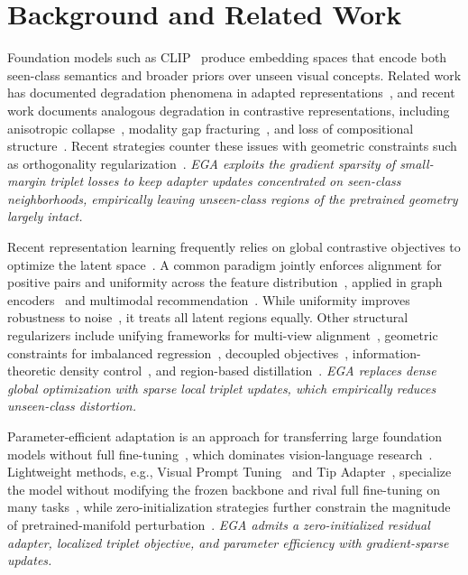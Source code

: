 \documentclass{article}
\begin{document}
\section{Background and Related Work}
\label{sec:lit}

Foundation models such as CLIP~\cite{clip_icml21} produce embedding spaces that encode both seen-class semantics and broader priors over unseen visual concepts.
Related work has documented degradation phenomena in adapted representations~\cite{lanza2026degradationfeaturespacecontinual, xue2025protocol}, and recent work documents analogous degradation in contrastive representations, including anisotropic collapse~\cite{zhao-etal-2024-representation, gao-etal-2021-simcse}, modality gap fracturing~\cite{10656738, eslami2025mitigate}, and loss of compositional structure~\cite{pal2025compositional, savietto2026geometryrepresentationalfailuresvision, 11093676}.
Recent strategies counter these issues with geometric constraints such as orthogonality regularization~\cite{ricci2026boldsymbollambdaorthogonality}.
\emph{EGA exploits the gradient sparsity of small-margin triplet losses
	to keep adapter updates concentrated on seen-class neighborhoods,
	empirically leaving unseen-class regions of the pretrained geometry
	largely intact.}

Recent representation learning frequently relies on global contrastive objectives to optimize the latent space~\cite{sui2026unicon, koromilas2025principledframeworkmultiviewcontrastive}.
A common paradigm jointly enforces alignment for positive pairs and uniformity across the feature distribution~\cite{10.5555/3524938.3525859}, applied in graph encoders~\cite{10.1609/aaai.v38i14.29479} and multimodal recommendation~\cite{zhou2025cm3calibratingmultimodalrecommendation}.
While uniformity improves robustness to noise~\cite{wu2026pca}, it treats all latent regions equally.
Other structural regularizers include unifying frameworks for multi-view alignment~\cite{alshammariunifying}, geometric constraints for imbalanced regression~\cite{dong2025improve}, decoupled objectives~\cite{kim2025decoupledcontrastivelearningfederated}, information-theoretic density control~\cite{Zhang_2025_ICCV}, and region-based distillation~\cite{jing2024fineclip}.
\emph{EGA replaces dense global optimization with sparse local triplet
	updates, which empirically reduces unseen-class distortion.}

Parameter-efficient adaptation is an approach for transferring large foundation models without full fine-tuning~\cite{pmlr-v97-houlsby19a, hu2022lora}, which dominates vision-language research~\cite{lin2025visionlanguagemodelssurvey}.
Lightweight methods, e.g., Visual Prompt Tuning~\cite{10.1007/978-3-031-19827-4_41} and Tip Adapter~\cite{tipadapter_eccv22}, specialize the model without modifying the frozen backbone and rival full fine-tuning on many tasks~\cite{sharma2025benchmarking}, while zero-initialization strategies further constrain the magnitude of pretrained-manifold perturbation~\cite{10377881}.
\emph{EGA admits a zero-initialized
	residual adapter, localized triplet objective, and parameter
	efficiency with gradient-sparse updates.}
\end{document}
